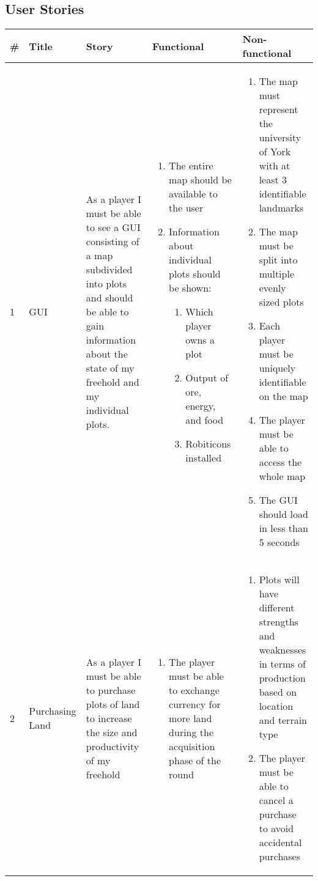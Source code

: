 \begin{landscape}
	\section{User Stories}
	\begin{longtable}{|l||l|p{4cm}|p{8cm}|p{7cm}|}
		\hline
		\# & Title & Story & Functional & Non-functional \\ \hline \hline \endhead
		1 & GUI & As a player I must be able to see a GUI consisting of a map subdivided into plots and should be able to gain information about the state of my freehold and my individual plots.
		& \begin{enumerate}[label=1.1.\arabic*.]
			\item The entire map should be available to the user
			\item Information about individual plots should be shown:
			\begin{enumerate}
				\item Which player owns a plot
				\item Output of ore, energy, and food
				\item Robiticons installed
			\end{enumerate}
		\end{enumerate}
		& \begin{enumerate}[label=1.2.\arabic*.]
			\item The map must represent the university of York with at least 3 identifiable landmarks
			\item The map must be split into multiple evenly sized plots
			\item Each player must be uniquely identifiable on the map
			\item The player must be able to access the whole map
			\item The GUI should load in less than 5 seconds
		\end{enumerate} \\ \hline
	
	2 & Purchasing Land
	& As a player I must be able to purchase plots of land to increase the size and productivity of my freehold
	& \begin{enumerate}[label=2.1.\arabic*.]
		\item The player must be able to exchange currency for more land during the acquisition phase of the round
	\end{enumerate}
	& \begin{enumerate}[label=2.2.\arabic*.]
		\item Plots will have different strengths and weaknesses in terms of production based on location and terrain type
		\item The player must be able to cancel a purchase to avoid accidental purchases
	\end{enumerate} \\ \hline


\end{longtable}
\end{landscape}
